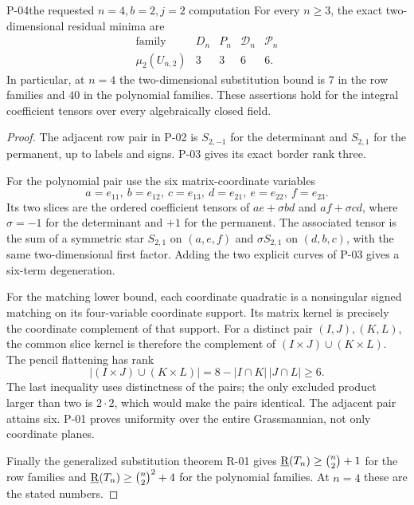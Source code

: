 \begin{finding}{P-04}{the requested \(n=4,b=2,j=2\) computation}
For every \(n\geq3\), the exact two-dimensional residual minima are
\[
 \begin{array}{c|cccc}
 \text{family}&D_n&P_n&\mathcal D_n&\mathcal P_n\\ \hline
 \mu_2(U_{n,2})&3&3&6&6 .
 \end{array}
\]
In particular, at \(n=4\) the two-dimensional substitution
bound is \(7\) in the row families and \(40\) in the polynomial
families. These assertions hold for the integral coefficient
tensors over every algebraically closed field.
\end{finding}
\begin{proof}
The adjacent row pair in P-02 is \(S_{2,-1}\) for the
determinant and \(S_{2,1}\) for the permanent, up to labels and
signs. P-03 gives its exact border rank three.

For the polynomial pair use the six matrix-coordinate variables
\[
 a=e_{11},\ b=e_{12},\ c=e_{13},\
 d=e_{21},\ e=e_{22},\ f=e_{23}.
\]
Its two slices are the ordered coefficient tensors of
\(ae+\sigma bd\) and \(af+\sigma cd\), where \(\sigma=-1\)
for the determinant and \(+1\) for the permanent.
The associated tensor is the sum of a symmetric star
\(S_{2,1}\) on \((a,e,f)\) and \(\sigma S_{2,1}\) on
\((d,b,c)\), with the same two-dimensional first factor.
Adding the two explicit curves of P-03 gives a six-term
degeneration.

For the matching lower bound, each coordinate quadratic is a
nonsingular signed matching on its four-variable coordinate
support. Its matrix kernel is precisely the coordinate
complement of that support. For a distinct pair
\((I,J),(K,L)\), the common slice kernel is therefore the
complement of
\((I\times J)\cup(K\times L)\). The pencil flattening has rank
\[
 |(I\times J)\cup(K\times L)|
   =8-|I\cap K|\,|J\cap L|\geq6.
\]
The last inequality uses distinctness of the pairs; the only
excluded product larger than two is \(2\cdot2\), which would
make the pairs identical. The adjacent pair attains six.
P-01 proves uniformity over the entire Grassmannian, not only
coordinate planes.

Finally the generalized substitution theorem R-01 gives
\(\underline{\mathrm R}(T_n)\geq\binom n2+1\) for the row families and
\(\underline{\mathrm R}(T_n)\geq\binom n2^2+4\) for the polynomial families.
At \(n=4\) these are the stated numbers.
\end{proof}

